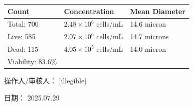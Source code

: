 \documentclass[UTF8,10pt,a4paper,fontset=fandol]{ctexart}
\newcommand{\fieldvalue}[1]{#1}
\newcommand{\handwritten}[1]{#1}
\begin{document}
\begin{center}
\begin{center}
\begin{tabularx}{\textwidth}{@{}lXl@{}}
Count & Concentration & Mean Diameter \\
\hline
Total: \fieldvalue{700}
&
\fieldvalue{$2.48\times10^{6}$ cells/mL}
&
\fieldvalue{14.6 micron}
\\
Live: \fieldvalue{585}
&
\fieldvalue{$2.07\times10^{6}$ cells/mL}
&
\fieldvalue{14.7 microns}
\\
Dead: \fieldvalue{115}
&
\fieldvalue{$4.05\times10^{5}$ cells/mL}
&
\fieldvalue{14.0 micron}
\\
Viability: \fieldvalue{83.6\%}
& &
\end{tabularx}

\vspace{1em}

\begin{center}
\hspace{0.03\textwidth}

\vspace{1em}

\hspace{0.03\textwidth}
\end{center}

\vfill

操作人/审核人：%
\fieldvalue{\handwritten{[illegible]}}

\hfill 日期：%
\fieldvalue{\handwritten{2025.07.29}}


\end{center}
\end{center}
\end{document}
